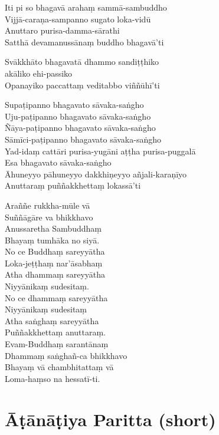\begin{paritta}

Iti pi so bhagavā arahaṃ sammā-sambuddho\\
Vijjā-caraṇa-sampanno sugato loka-vidū\\
Anuttaro purisa-damma-sārathi\\
Satthā devamanussānaṃ buddho bhagavā'ti

Svākkhāto bhagavatā dhammo sandiṭṭhiko\\
\vin akāliko ehi-passiko\\
Opanayiko paccattaṃ veditabbo viññūhī'ti

Supaṭipanno bhagavato sāvaka-saṅgho\\
Uju-paṭipanno bhagavato sāvaka-saṅgho\\
Ñāya-paṭipanno bhagavato sāvaka-saṅgho\\
Sāmīci-paṭipanno bhagavato sāvaka-saṅgho\\
Yad-idaṃ cattāri purisa-yugāni aṭṭha purisa-puggalā\\
Esa bhagavato sāvaka-saṅgho\\
Āhuneyyo pāhuneyyo dakkhiṇeyyo añjali-karaṇīyo\\
Anuttaraṃ puññakkhettaṃ lokassā'ti

\sidepar{\pointerMark}%
Araññe rukkha-mūle vā\\
Suññāgāre va bhikkhavo\\
Anussaretha Sambuddhaṃ\\
Bhayaṃ tumhāka no siyā.\\
No ce Buddhaṃ sareyyātha\\
Loka-jeṭṭhaṃ nar'āsabhaṃ\\
Atha dhammaṃ sareyyātha\\
Niyyānikaṃ sudesitaṃ.\\
No ce dhammaṃ sareyyātha\\
Niyyānikaṃ sudesitaṃ\\
Atha saṅghaṃ sareyyātha\\
Puññakkhettaṃ anuttaraṃ.\\
Evam-Buddhaṃ sarantānaṃ\\
Dhammaṃ saṅghañ-ca bhikkhavo\\
Bhayaṃ vā chambhitattaṃ vā\\
Loma-haṃso na hessatī-ti.


\end{paritta}

\section{Āṭānāṭiya Paritta (short)}

